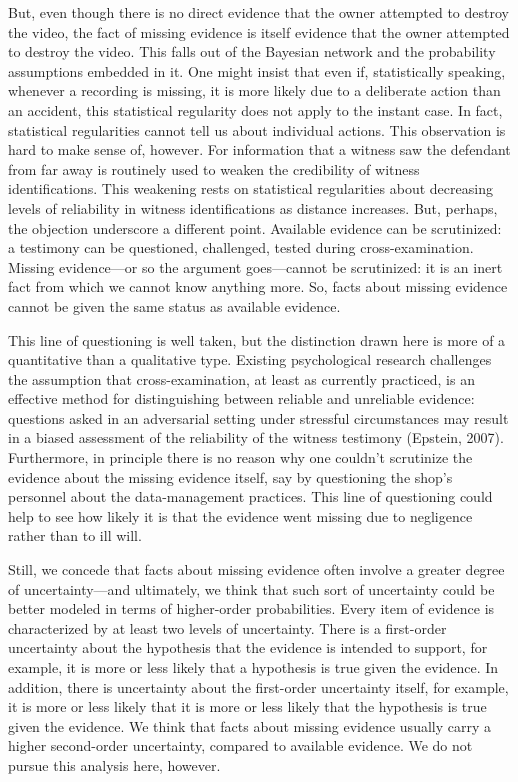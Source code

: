 \documentclass[
  10pt,
  dvipsnames,enabledeprecatedfontcommands]{scrartcl}
\begin{document}
But, even though there is no direct evidence that the owner attempted to
destroy the video, the fact of missing evidence is itself evidence that
the owner attempted to destroy the video. This falls out of the Bayesian
network and the probability assumptions embedded in it. One might insist
that even if, statistically speaking, whenever a recording is missing,
it is more likely due to a deliberate action than an accident, this
statistical regularity does not apply to the instant case. In fact,
statistical regularities cannot tell us about individual actions. This
observation is hard to make sense of, however. For information that a
witness saw the defendant from far away is routinely used to weaken the
credibility of witness identifications. This weakening rests on
statistical regularities about decreasing levels of reliability in
witness identifications as distance increases. But, perhaps, the
objection underscore a different point. Available evidence can be
scrutinized: a testimony can be questioned, challenged, tested during
cross-examination. Missing evidence---or so the argument goes---cannot
be scrutinized: it is an inert fact from which we cannot know anything
more. So, facts about missing evidence cannot be given the same status
as available evidence.

This line of questioning is well taken, but the distinction drawn here
is more of a quantitative than a qualitative type. Existing
psychological research challenges the assumption that cross-examination,
at least as currently practiced, is an effective method for
distinguishing between reliable and unreliable evidence: questions asked
in an adversarial setting under stressful circumstances may result in a
biased assessment of the reliability of the witness testimony (Epstein,
2007). Furthermore, in principle there is no reason why one couldn't
scrutinize the evidence about the missing evidence itself, say by
questioning the shop's personnel about the data-management practices.
This line of questioning could help to see how likely it is that the
evidence went missing due to negligence rather than to ill will.

Still, we concede that facts about missing evidence often involve a
greater degree of uncertainty---and ultimately, we think that such sort
of uncertainty could be better modeled in terms of higher-order
probabilities. Every item of evidence is characterized by at least two
levels of uncertainty. There is a first-order uncertainty about the
hypothesis that the evidence is intended to support, for example, it is
more or less likely that a hypothesis is true given the evidence. In
addition, there is uncertainty about the first-order uncertainty itself,
for example, it is more or less likely that it is more or less likely
that the hypothesis is true given the evidence. We think that facts
about missing evidence usually carry a higher second-order uncertainty,
compared to available evidence. We do not pursue this analysis here,
however.
\end{document}
